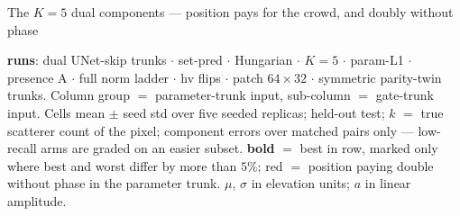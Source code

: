 \begin{frame}{The $K{=}5$ dual components --- position pays for the crowd, and doubly without phase}
  \parbox{0.82\textwidth}{\tiny\color{soft} \textbf{runs}: dual UNet-skip trunks $\cdot$ set-pred $\cdot$ Hungarian $\cdot$ $K{=}5$ $\cdot$ param-L1 $\cdot$ presence A $\cdot$ full norm ladder $\cdot$ hv flips $\cdot$ patch $64{\times}32$ $\cdot$ symmetric parity-twin trunks. Column group $=$ parameter-trunk input, sub-column $=$ gate-trunk input. Cells mean $\pm$ seed std over five seeded replicas; held-out test; $k$ $=$ true scatterer count of the pixel; component errors over matched pairs only --- low-recall arms are graded on an easier subset. \textbf{bold} $=$ best in row, marked only where best and worst differ by more than $5\%$; \textcolor{accent}{red} $=$ position paying double without phase in the parameter trunk. $\mu$, $\sigma$ in elevation units; $a$ in linear amplitude.\par}
\end{frame}

